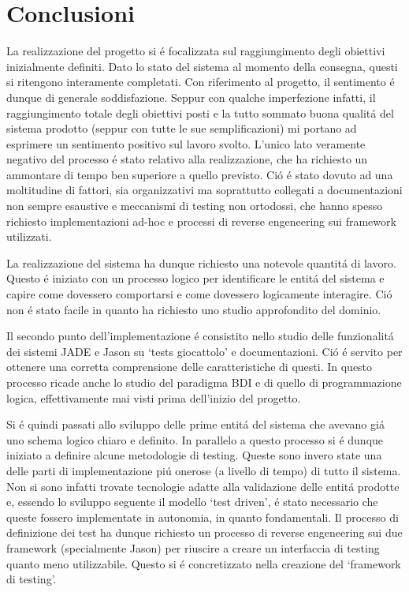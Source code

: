 \section{Conclusioni}

La realizzazione del progetto si \'e focalizzata sul raggiungimento degli obiettivi inizialmente definiti. Dato lo stato del sistema al momento della consegna, questi si ritengono interamente completati. Con riferimento al progetto, il sentimento \'e dunque di generale soddisfazione. Seppur con qualche imperfezione infatti, il raggiungimento totale degli obiettivi posti e la tutto sommato buona qualit\'a del sistema prodotto (seppur con tutte le sue semplificazioni) mi portano ad esprimere un sentimento positivo sul lavoro svolto. L'unico lato veramente negativo del processo \'e stato relativo alla realizzazione, che ha richiesto un ammontare di tempo ben superiore a quello previsto. Ci\'o \'e stato dovuto ad una moltitudine di fattori, sia organizzativi ma soprattutto collegati a documentazioni non sempre esaustive e meccanismi di testing non ortodossi, che hanno spesso richiesto implementazioni ad-hoc e processi di reverse engeneering sui framework utilizzati.

\parag
La realizzazione del sistema ha dunque richiesto una notevole quantit\'a di lavoro. Questo \'e iniziato con un processo logico per identificare le entit\'a del sistema e capire come dovessero comportarsi e come dovessero logicamente interagire. Ci\'o non \'e stato facile in quanto ha richiesto uno studio approfondito del dominio.

Il secondo punto dell'implementazione \'e consistito nello studio delle funzionalit\'a dei sistemi JADE e Jason su `tests giocattolo' e documentazioni. Ci\'o \'e servito per ottenere una corretta comprensione delle caratteristiche di questi. In questo processo ricade anche lo studio del paradigma BDI e di quello di programmazione logica, effettivamente mai visti prima dell'inizio del progetto.

Si \'e quindi passati allo sviluppo delle prime entit\'a del sistema che avevano gi\'a uno schema logico chiaro e definito. In parallelo a questo processo si \'e dunque iniziato a definire alcune metodologie di testing. Queste sono invero state una delle parti di implementazione pi\'u onerose (a livello di tempo) di tutto il sistema. Non si sono infatti trovate tecnologie adatte alla validazione delle entit\'a prodotte e, essendo lo sviluppo seguente il modello `test driven', \'e stato necessario che queste fossero implementate in autonomia, in quanto fondamentali. Il processo di definizione dei test ha dunque richiesto un processo di reverse engeneering sui due framework (specialmente Jason) per riuscire a creare un interfaccia di testing quanto meno utilizzabile. Questo si \'e concretizzato nella creazione del `framework di testing'.

